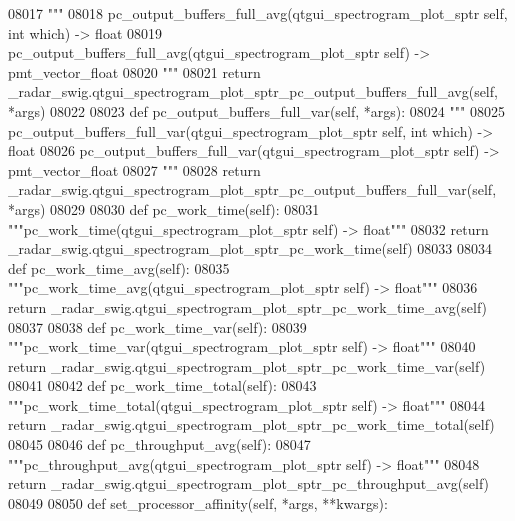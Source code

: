 \begin{DoxyCode}
{{{{{{{{{{{{{{{{{{{{{{{{{{08017         \textcolor{stringliteral}{"""}
08018 \textcolor{stringliteral}{        pc\_output\_buffers\_full\_avg(qtgui\_spectrogram\_plot\_sptr self, int which) -> float}
08019 \textcolor{stringliteral}{        pc\_output\_buffers\_full\_avg(qtgui\_spectrogram\_plot\_sptr self) -> pmt\_vector\_float}
08020 \textcolor{stringliteral}{        """}
08021         \textcolor{keywordflow}{return} \_radar\_swig.qtgui\_spectrogram\_plot\_sptr\_pc\_output\_buffers\_full\_avg(self, *args)
08022 
08023     \textcolor{keyword}{def }pc_output_buffers_full_var(self, *args):
08024         \textcolor{stringliteral}{"""}
08025 \textcolor{stringliteral}{        pc\_output\_buffers\_full\_var(qtgui\_spectrogram\_plot\_sptr self, int which) -> float}
08026 \textcolor{stringliteral}{        pc\_output\_buffers\_full\_var(qtgui\_spectrogram\_plot\_sptr self) -> pmt\_vector\_float}
08027 \textcolor{stringliteral}{        """}
08028         \textcolor{keywordflow}{return} \_radar\_swig.qtgui\_spectrogram\_plot\_sptr\_pc\_output\_buffers\_full\_var(self, *args)
08029 
08030     \textcolor{keyword}{def }pc_work_time(self):
08031         \textcolor{stringliteral}{"""pc\_work\_time(qtgui\_spectrogram\_plot\_sptr self) -> float"""}
08032         \textcolor{keywordflow}{return} \_radar\_swig.qtgui\_spectrogram\_plot\_sptr\_pc\_work\_time(self)
08033 
08034     \textcolor{keyword}{def }pc_work_time_avg(self):
08035         \textcolor{stringliteral}{"""pc\_work\_time\_avg(qtgui\_spectrogram\_plot\_sptr self) -> float"""}
08036         \textcolor{keywordflow}{return} \_radar\_swig.qtgui\_spectrogram\_plot\_sptr\_pc\_work\_time\_avg(self)
08037 
08038     \textcolor{keyword}{def }pc_work_time_var(self):
08039         \textcolor{stringliteral}{"""pc\_work\_time\_var(qtgui\_spectrogram\_plot\_sptr self) -> float"""}
08040         \textcolor{keywordflow}{return} \_radar\_swig.qtgui\_spectrogram\_plot\_sptr\_pc\_work\_time\_var(self)
08041 
08042     \textcolor{keyword}{def }pc_work_time_total(self):
08043         \textcolor{stringliteral}{"""pc\_work\_time\_total(qtgui\_spectrogram\_plot\_sptr self) -> float"""}
08044         \textcolor{keywordflow}{return} \_radar\_swig.qtgui\_spectrogram\_plot\_sptr\_pc\_work\_time\_total(self)
08045 
08046     \textcolor{keyword}{def }pc_throughput_avg(self):
08047         \textcolor{stringliteral}{"""pc\_throughput\_avg(qtgui\_spectrogram\_plot\_sptr self) -> float"""}
08048         \textcolor{keywordflow}{return} \_radar\_swig.qtgui\_spectrogram\_plot\_sptr\_pc\_throughput\_avg(self)
08049 
08050     \textcolor{keyword}{def }set_processor_affinity(self, *args, **kwargs):
}}}}}}}}}}}}}}}}}}}}}}}}}}
\end{DoxyCode}
